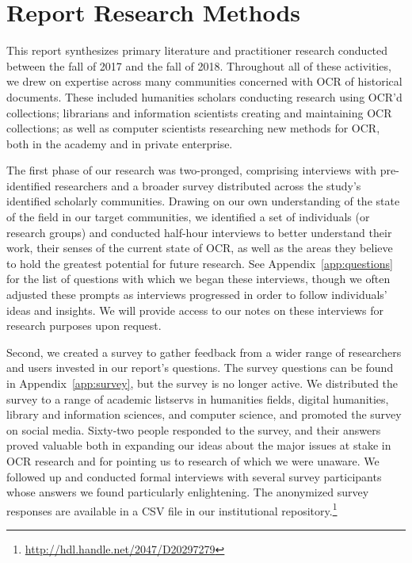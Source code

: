 \documentclass[twoside,11pt]{report}
\begin{document}
\section{Report Research Methods}

This report synthesizes primary literature and practitioner research conducted between the fall of 2017 and the fall of 2018. Throughout all of these activities, we drew on expertise across many communities concerned with OCR of historical documents. These included humanities scholars conducting research using OCR'd collections; librarians and information scientists creating and maintaining OCR collections; as well as computer scientists researching new methods for OCR, both in the academy and in private enterprise.

The first phase of our research was two-pronged, comprising interviews with pre-identified researchers and a broader survey distributed across the study's identified scholarly communities. Drawing on our own understanding of the state of the field in our target communities, we identified a set of individuals (or research groups) and conducted half-hour interviews to better understand their work, their senses of the current state of OCR, as well as the areas they believe to hold the greatest potential for future research. See Appendix~\ref{app:questions} for the list of questions with which we began these interviews, though we often adjusted these prompts as interviews progressed in order to follow individuals' ideas and insights. We will provide access to our notes on these interviews for research purposes upon request.

Second, we created a survey to gather feedback from a wider range of researchers and users invested in our report's questions. The survey questions can be found in Appendix~\ref{app:survey}, but the survey is no longer active. We distributed the survey to a range of academic listservs in humanities fields, digital humanities, library and information sciences, and computer science, and promoted  the survey on social media. Sixty-two people responded to the survey, and their answers proved valuable both in expanding our ideas about the major issues at stake in OCR research and for pointing us to research of which we were unaware. We followed up and conducted formal interviews with several survey participants whose answers we found particularly enlightening.  The anonymized survey responses are available in a CSV file in our institutional repository.\footnote{\url{http://hdl.handle.net/2047/D20297279}}
\end{document}
